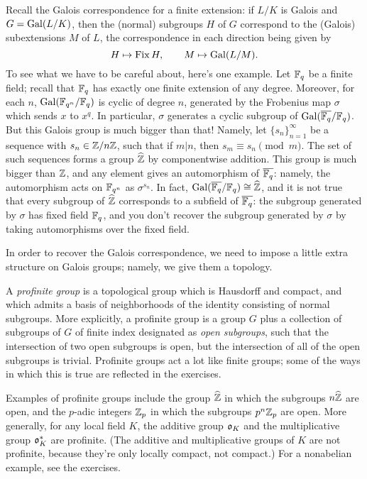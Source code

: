 Recall the Galois correspondence for a finite extension: if $L/K$ is Galois
and $G = \operatorname{Gal}(L/K)$, then the (normal) subgroups $H$ of $G$ correspond to the
(Galois) subextensions $M$ of $L$, the correspondence in each direction
being given by
\[
H \mapsto \operatorname{Fix}{H},
\qquad
M \mapsto \operatorname{Gal}(L/M).
\]
To see what we have to be careful about, here's one example. Let $\mathbb{F}_q$
be a finite field; recall that $\mathbb{F}_q$ has exactly one finite extension of
any degree. Moreover, for each $n$, $\operatorname{Gal}(\mathbb{F}_{q^n}/\mathbb{F}_q)$ is cyclic of
degree $n$, generated by the Frobenius map $\sigma$ which sends $x$ to
$x^q$. In particular, $\sigma$ generates a cyclic subgroup of
$\operatorname{Gal}(\overline{\mathbb{F}_q}/\mathbb{F}_q)$. But this Galois group is much bigger than
that! Namely,
let $\{s_n\}_{n=1}^\infty$ be a sequence with $s_n \in \mathbb{Z}/n\mathbb{Z}$, such that
if $m | n$, then $s_m \equiv s_n \pmod{m}$. 
The set of such sequences forms
a group $\widehat{\mathbb{Z}}$ by componentwise addition.
This group is much bigger
than $\mathbb{Z}$, and any element gives an automorphism of $\overline{\mathbb{F}_q}$:
namely, the automorphism acts on $\mathbb{F}_{q^n}$ as $\sigma^{s_n}$. In fact,
$\operatorname{Gal}(\overline{\mathbb{F}_q}/\mathbb{F}_q) \cong \widehat{\mathbb{Z}}$, and it is not true that
every subgroup of $\widehat{\mathbb{Z}}$ corresponds to a subfield of
$\overline{\mathbb{F}_q}$: the subgroup generated by $\sigma$ has fixed field
$\mathbb{F}_q$, and you don't recover the subgroup generated by $\sigma$ by taking
automorphisms over the fixed field.

In order to recover the Galois correspondence, we need to impose a little
extra structure on Galois groups; namely, we give them a topology.

A \emph{profinite group} is a topological group which is Hausdorff and
compact, and which admits a basis of neighborhoods of the identity consisting
of normal subgroups. More explicitly, a profinite group is a group $G$
plus a collection of subgroups of $G$ of finite index designated as
\emph{open subgroups}, such that the intersection of two open subgroups is
open, but the intersection of all of the open subgroups is trivial.
Profinite groups act a lot like finite groups; some of the ways in which
this is true are reflected in the exercises.

Examples of profinite groups include the group $\widehat{\mathbb{Z}}$ in which
the subgroups $n\widehat{\mathbb{Z}}$ are open, and the $p$-adic integers $\mathbb{Z}_p$
in which the subgroups $p^n \mathbb{Z}_p$ are open. More generally, for any local
field $K$, the additive group $\mathfrak{o}_K$ and the multiplicative group
$\mathfrak{o}_K^*$ are profinite. (The additive and multiplicative groups of $K$
are not profinite, because they're only locally compact, not compact.)
For a nonabelian example, see the exercises.

